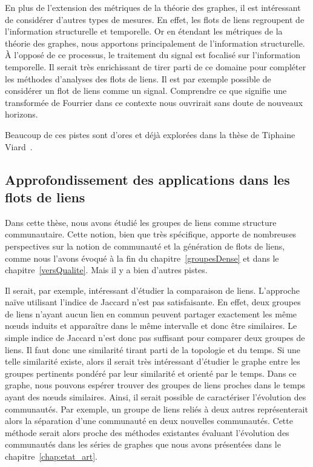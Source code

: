 En plus de l'extension des métriques de la théorie  des graphes, il est intéressant de considérer d'autres types de mesures.
En effet, les flots de liens regroupent de l'information structurelle et temporelle.
Or en étendant les métriques de la théorie des graphes, nous apportons principalement de l'information structurelle.
\`A l'opposé de ce processus, le traitement du signal est focalisé sur l'information temporelle.
Il serait très enrichissant de tirer parti de ce domaine pour compléter les méthodes d'analyses des flots de liens.
Il est par exemple possible de considérer un flot de liens comme un signal.
Comprendre ce que signifie une transformée de Fourrier dans ce contexte nous ouvrirait sans doute de nouveaux horizons.

Beaucoup de ces pistes sont d'ores et déjà explorées dans la thèse de Tiphaine Viard~\cite{viard2016flots}.

\subsection{Approfondissement des applications dans les flots de liens}
Dans cette thèse, nous avons étudié les groupes de liens comme structure communautaire.
Cette notion, bien que très spécifique, apporte de nombreuses perspectives sur la notion de communauté et la génération de flots de liens, comme nous l'avons évoqué à la fin du chapitre~\ref{groupesDense} et dans le chapitre~\ref{versQualite}.
Mais il y a bien d'autres pistes.

Il serait, par exemple, intéressant d'étudier la comparaison de liens.
L'approche naïve utilisant l'indice de Jaccard n'est pas satisfaisante.
En effet, deux groupes de liens n'ayant aucun lien en commun peuvent partager exactement les même n\oe{}uds induits et apparaître dans le même intervalle et donc être similaires.
Le simple indice de Jaccard n'est donc pas suffisant pour comparer deux groupes de liens.
Il faut donc une similarité tirant parti de la topologie et du temps.
Si une telle similarité existe, alors il serait très intéressant d'étudier le graphe entre les groupes pertinents pondéré par leur similarité et orienté par le temps.
Dans ce graphe, nous pouvons espérer trouver des groupes de liens proches dans le temps ayant des n\oe{}uds similaires.
Ainsi, il serait possible de caractériser l'évolution des communautés.
Par exemple, un groupe de liens reliés à deux autres représenterait alors la séparation d'une communauté en deux nouvelles communautés.
Cette méthode serait alors proche des méthodes existantes évaluant l'évolution des communautés dans les séries de graphes que nous avons présentées dans le chapitre~\ref{chap:etat_art}.


